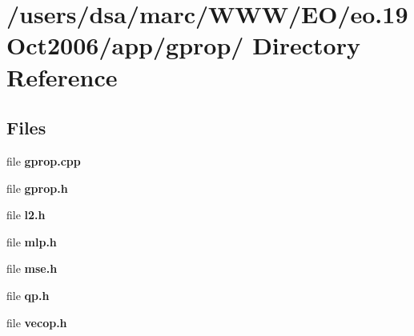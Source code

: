 \section{/users/dsa/marc/WWW/EO/eo.19Oct2006/app/gprop/ Directory Reference}
\label{dir_000023}
\subsection*{Files}
\begin{CompactItemize}
\item 
file {\bf gprop.cpp}
\item 
file {\bf gprop.h}
\item 
file {\bf l2.h}
\item 
file {\bf mlp.h}
\item 
file {\bf mse.h}
\item 
file {\bf qp.h}
\item 
file {\bf vecop.h}
\end{CompactItemize}
